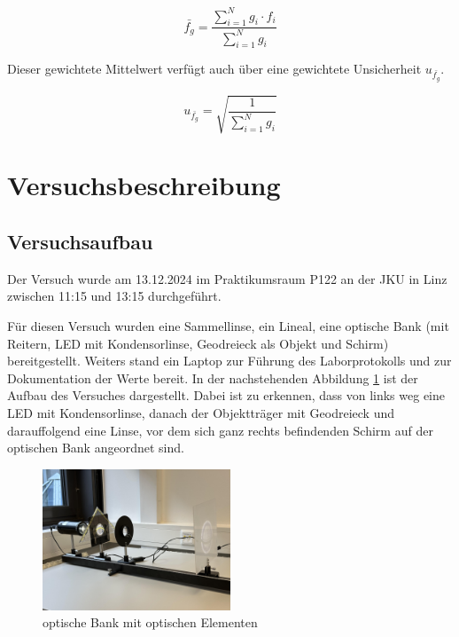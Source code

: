 \documentclass[a4paper,12pt]{article}
\begin{document}
\begin{equation}
    \label{eq:Mittelwert}
    \bar{f_g} = \frac{\sum_{i=1}^{N} g_i \cdot f_i}{\sum_{i=1}^{N} g_i}
\end{equation}

Dieser gewichtete Mittelwert verfügt auch über eine gewichtete Unsicherheit $u_{\bar{f_g}}$.

\begin{equation}
    \label{eq:GewichtUnsicherheit}
    u_{\bar{f_g}} = \sqrt{\frac{1}{\sum_{i=1}^{N} g_i}}
\end{equation}

\section{Versuchsbeschreibung}
\subsection{Versuchsaufbau}

Der Versuch wurde am 13.12.2024 im Praktikumsraum P122 an der JKU in Linz zwischen 11:15 und
13:15 durchgeführt.

Für diesen Versuch wurden eine Sammellinse, ein Lineal, eine optische Bank (mit Reitern, LED
mit Kondensorlinse, Geodreieck als Objekt und Schirm) bereitgestellt.
Weiters stand ein Laptop zur Führung des Laborprotokolls und zur Dokumentation der Werte bereit.
In der nachstehenden Abbildung \ref{Abb:Versuchsaufbau1} ist der Aufbau des Versuches dargestellt.
Dabei ist zu erkennen, dass von links weg eine LED mit Kondensorlinse, danach der Objektträger
mit Geodreieck und darauffolgend eine Linse, vor dem sich ganz rechts befindenden Schirm auf der
optischen Bank angeordnet sind.

\begin{figure}[H]
    \centering
    \includegraphics[width=0.5\textwidth]{bilder/Versuchsaufbau1.jpg}           %
    \caption{optische Bank mit optischen Elementen}                             %
    \label{Abb:Versuchsaufbau1}
\end{figure}
\end{document}
